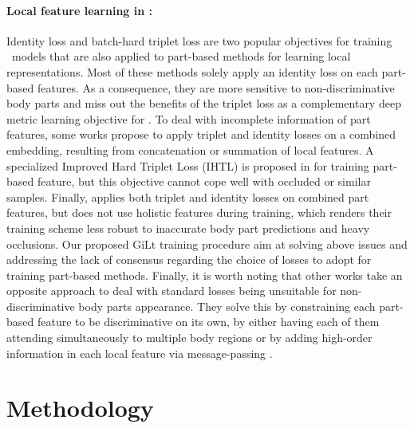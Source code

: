 \documentclass[10pt,twocolumn,letterpaper]{article}
\begin{document}
\paragraph{Local feature learning in {\reid}:} Identity loss and batch-hard triplet loss \cite{triplet} are two popular objectives for training \reid\ models that are also applied to part-based methods \cite{EXAM, PGFA, SRNet, HOReID, ISP, HPNet, MHSA-Net, PVPM} for learning local representations.
Most of these methods \cite{PCB, SGAM, PGFA, EXAM} solely apply an identity loss on each part-based features. 
As a consequence, they are more sensitive to non-discriminative body parts and miss out the benefits \cite{triplet, BoT} of the triplet loss as a complementary deep metric learning objective for {\reid}.
To deal with incomplete information of part features, some works \cite{ISP, MHSA-Net} propose to apply triplet and identity losses on a combined embedding, resulting from concatenation or summation of local features.
A specialized Improved Hard Triplet Loss (IHTL) is proposed in \cite{MHSA-Net} for training part-based feature, but this objective cannot cope well with occluded or similar samples.
Finally, \cite{HPNet} applies both triplet and identity losses on combined part features, but does not use holistic features during training, which renders their training scheme less robust to inaccurate body part predictions and heavy occlusions.
Our proposed GiLt training procedure aim at solving above issues and addressing the lack of consensus regarding the choice of losses to adopt for training part-based methods.
Finally, it is worth noting that other works \cite{PAT, HOReID} take an opposite approach to deal with standard {\reid} losses being unsuitable for non-discriminative body parts appearance.
They solve this by constraining each part-based feature to be discriminative on its own, by either having each of them attending simultaneously to multiple body regions \cite{PAT} or by adding high-order information in each local feature via message-passing \cite{HOReID}.











%
 









\section{Methodology} \label{methodology}
\end{document}
